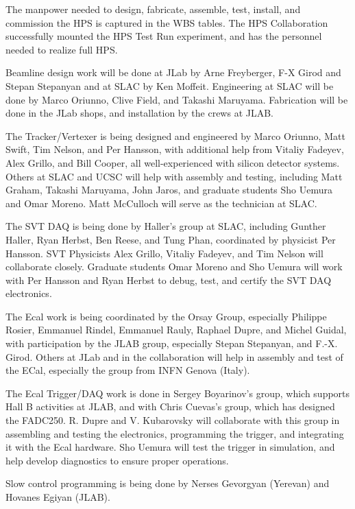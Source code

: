 The manpower needed to design, fabricate, assemble, test, install, and commission the HPS is captured in the WBS tables. 
The HPS Collaboration successfully mounted the HPS Test Run experiment, and has the personnel needed to realize full HPS.

Beamline design work will be done at JLab by Arne Freyberger, F-X Girod and Stepan Stepanyan and at SLAC by Ken Moffeit. 
Engineering at SLAC will be done by Marco Oriunno, Clive Field, and Takashi Maruyama. Fabrication will be done in the 
JLab shops, and installation by the crews at JLAB. 

The Tracker/Vertexer is being designed and engineered by Marco Oriunno, Matt Swift, Tim Nelson, and Per Hansson, with additional help 
from Vitaliy Fadeyev, Alex Grillo, and Bill Cooper, all well-experienced with silicon detector systems. Others at SLAC and UCSC will 
help with assembly and testing, including Matt Graham, Takashi Maruyama, John Jaros, and 
graduate students Sho Uemura and Omar Moreno. Matt McCulloch will serve as the technician at SLAC.

The SVT DAQ is being done by Haller's group at SLAC, including Gunther Haller, Ryan 
Herbst, Ben Reese, and Tung Phan, coordinated by physicist Per Hansson. SVT Physicists Alex Grillo, Vitaliy Fadeyev, and Tim Nelson will collaborate closely. 
Graduate students Omar Moreno and Sho Uemura will work with Per Hansson and Ryan Herbst to debug, test, and certify the SVT DAQ electronics.

The Ecal work is being coordinated by the Orsay Group, especially Philippe Rosier, Emmanuel Rindel, Emmanuel Rauly, Raphael Dupre, and Michel Guidal, 
with participation by the JLAB group, especially Stepan Stepanyan, and F.-X. Girod.  Others at JLab and in the collaboration will help in 
assembly and test of the ECal, especially the group from INFN Genova (Italy).

The Ecal Trigger/DAQ work is done in Sergey Boyarinov's group, which supports Hall B activities at JLAB, and with Chris Cuevas's group, which has designed the FADC250.
R. Dupre and  V. Kubarovsky will collaborate with this group in assembling and testing the electronics, programming the trigger, and integrating it with 
the Ecal hardware. Sho Uemura will test the trigger in simulation, and help develop diagnostics to ensure proper operations.

Slow control programming is being done by Nerses Gevorgyan (Yerevan) and Hovanes Egiyan (JLAB).

